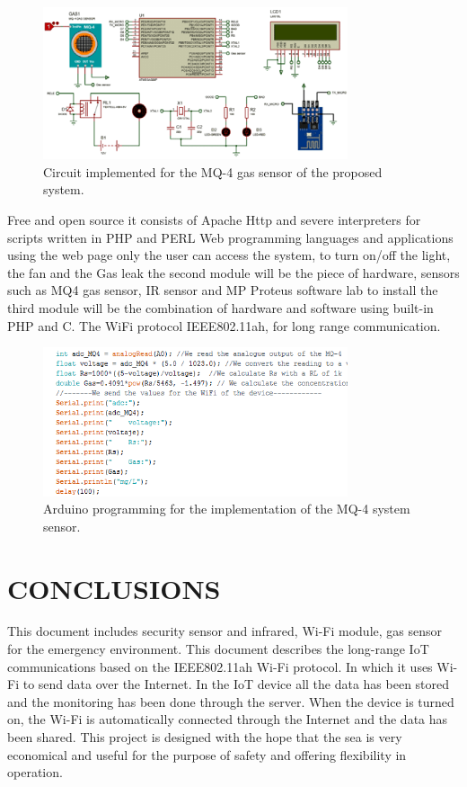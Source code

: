 \documentclass[11pt]{article}
\begin{document}
\begin{figure}[!htb]
    \centering
    \includegraphics[width=0.8\textwidth]{circuit MQ-4.png}
    \caption{ Circuit implemented for the MQ-4 gas sensor of
the proposed system.}
    \label{left}
\end{figure} 

Free and open source it consists of Apache Http and severe interpreters for scripts written in PHP and PERL Web programming languages and applications using the web page only the user can access the system, to turn on/off the light, the fan and the Gas leak the second module will be the piece of hardware, sensors such as MQ4 gas sensor, IR sensor and MP Proteus software lab to install the third module will be the combination of hardware and software using built-in PHP and C. The WiFi protocol IEEE802.11ah, for long range communication.

\begin{figure}
    \centering
    \includegraphics[width=0.8\textwidth]{Aurdino code.png}
    \caption{ Arduino programming for the implementation
of the MQ-4 system sensor.}
    \label{left}
\end{figure}

\newpage

\section{CONCLUSIONS}

This document includes security sensor and infrared, Wi-Fi module, gas sensor for the emergency environment. This document describes the long-range IoT communications based on the IEEE802.11ah Wi-Fi protocol. In which it uses Wi-Fi to send data over the Internet. In the IoT device all the data has been stored and the monitoring has been done through the server. When the device is turned on, the Wi-Fi is automatically connected through the Internet and the data has been shared. This project is designed with the hope that the sea is very economical and useful for the purpose of safety and offering flexibility in operation.
\end{document}
